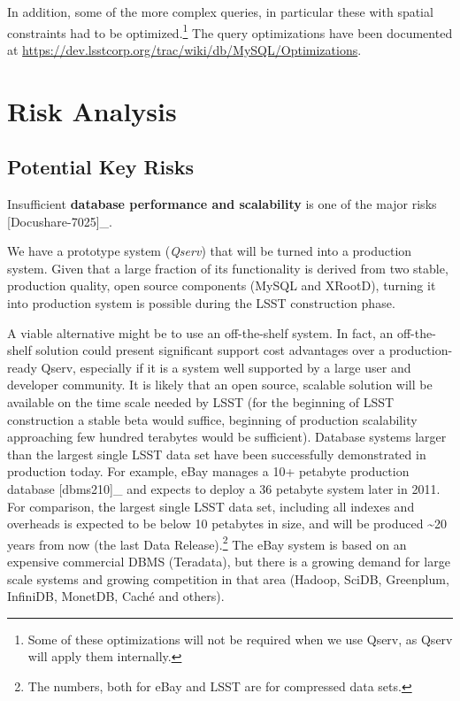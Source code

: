 \documentclass[DM,lsstdraft,toc]{lsstdoc}
\begin{document}
In addition, some of the more complex queries, in particular these with
spatial constraints had to be optimized.\footnote{Some of these
  optimizations will not be required when we use Qserv, as Qserv will
  apply them internally.} The query optimizations have been documented
at \url{https://dev.lsstcorp.org/trac/wiki/db/MySQL/Optimizations}.

\section{Risk Analysis}\label{risk-analysis}

\subsection{Potential Key Risks}\label{potential-key-risks}

Insufficient \textbf{database performance and scalability} is one of the
major risks {[}Docushare-7025{]}\_.

We have a prototype system (\emph{Qserv}) that will be turned into a
production system. Given that a large fraction of its functionality is
derived from two stable, production quality, open source components
(MySQL and XRootD), turning it into production
system is possible during the LSST construction phase.

A viable alternative might be to use an off-the-shelf system. In fact,
an off-the-shelf solution could present significant support cost
advantages over a production-ready Qserv, especially if it is a system
well supported by a large user and developer community. It is likely
that an open source, scalable solution will be available on the time
scale needed by LSST (for the beginning of LSST construction a stable
beta would suffice, beginning of production scalability approaching few
hundred terabytes would be sufficient). Database systems larger than the
largest single LSST data set have been successfully demonstrated in
production today. For example, eBay manages a 10+ petabyte production
database {[}dbms210{]}\_ and expects to deploy a 36 petabyte system
later in 2011. For comparison, the largest single LSST data set,
including all indexes and overheads is expected to be below 10 petabytes
in size, and will be produced \textasciitilde{}20 years from now (the
last Data Release).\footnote{The numbers, both for eBay and LSST are for
  compressed data sets.} The eBay system is based on an expensive
commercial DBMS (Teradata), but there is a growing demand for large
scale systems and growing competition in that area (Hadoop, SciDB,
Greenplum, InfiniDB, MonetDB, Caché and others).
\end{document}

